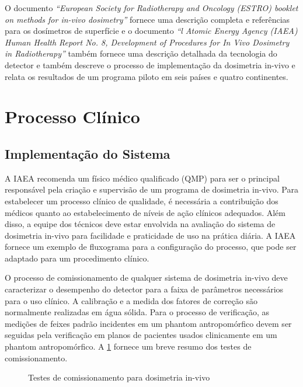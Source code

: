\documentclass[11pt,a4paper]{article}
\newcounter{exemplo}
\begin{document}
	O documento \textit{``European Society for Radiotherapy and Oncology (ESTRO) booklet on methods for in-vivo dosimetry''} fornece uma descrição completa e referências para os dosímetros de superfície e o documento \textit{``l Atomic Energy Agency (IAEA) Human Health Report No. 8, Development of Procedures for In Vivo Dosimetry in Radiotherapy''} também fornece uma descrição detalhada da tecnologia do detector e também descreve o processo de implementação da dosimetria in-vivo e relata os resultados de um programa piloto em seis países e quatro continentes.


\section{Processo Clínico}

\subsection*{Implementação do Sistema}

	A IAEA recomenda um físico médico qualificado (QMP) para ser o principal responsável pela criação e supervisão de um programa de dosimetria in-vivo. Para estabelecer um processo clínico de qualidade, é necessária a contribuição dos médicos quanto ao estabelecimento de níveis de ação clínicos adequados. Além disso, a equipe dos técnicos deve estar envolvida na avaliação do sistema de dosimetria in-vivo para facilidade e praticidade de uso na prática  diária. A IAEA fornece um exemplo de fluxograma para a configuração do processo, que pode ser adaptado para um procedimento clínico.

	O processo de comissionamento de qualquer sistema de dosimetria in-vivo deve caracterizar o desempenho do detector para a faixa de parâmetros necessários para o uso clínico. A 
	calibração e a medida dos fatores de correção são normalmente realizadas em água sólida. Para o processo de verificação, as medições de feixes padrão incidentes em um phantom  antropomórfico devem ser seguidas pela verificação em planos de pacientes usados clinicamente em um phantom antropomórfico. A \ref{fig:medidasDosimetrosInVivo} fornece um breve resumo dos testes de comissionamento.

	\begin{figure}[h]
		\centering
		\caption{Testes de comissionamento para dosimetria in-vivo}
		\label{fig:medidasDosimetrosInVivo}
	\end{figure}
\end{document}
